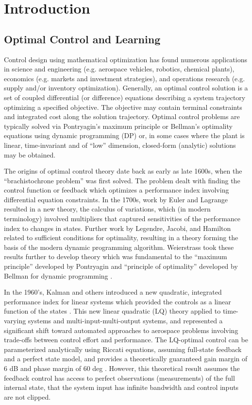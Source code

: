 \chapter{Introduction}
\label{chap:intro}

\section{Optimal Control and Learning}
\label{chap:introOptimalControlLearning}
Control design using mathematical optimization has found numerous applications in science and engineering (e.g. aerospace vehicles, robotics, chemical plants), economics (e.g. markets and investment strategies), and operations research (e.g. supply and/or inventory optimization).  Generally, an optimal control solution is a set of coupled differential (or difference) equations describing a system trajectory optimizing a specified objective.  The objective may contain terminal constraints and integrated cost along the solution trajectory.  Optimal control problems are typically solved via Pontryagin's maximum principle or Bellman's optimality equations using dynamic programming (DP) \cite{stengel,kirk} or, in some cases where the plant is linear, time-invariant and of ``low'' dimension, closed-form (analytic) solutions may be obtained.

The origins of optimal control theory date back as early as late 1600s, when the ``brachistochrone problem'' was first solved.  The problem dealt with finding the control function or feedback which optimizes a performance index involving differential equation constraints.  In the 1700s, work by Euler and Lagrange resulted in a new theory, the calculus of variations, which (in modern terminology) involved multipliers that captured sensitivities of the performance index to changes in states.  Further work by Legendre, Jacobi, and Hamilton related to sufficient conditions for optimality, resulting in a theory forming the basis of the modern dynamic programming algorithm.  Weierstrass took these results further to develop theory which was fundamental to the ``maximum principle'' developed by Pontryagin and ``principle of optimality'' developed by Bellman for dynamic programming \cite{bryson1996optimal}.

In the 1960's, Kalman and others introduced a new quadratic, integrated performance index for linear systems which provided the controls as a linear function of the states \cite{kalman1960contributions}.  This new linear quadratic (LQ) theory applied to time-varying systems and multi-input-multi-output systems, and represented a significant shift toward automated approaches to aerospace problems involving trade-offs between control effort and performance.  The LQ-optimal control can be parameterized analytically using Riccati equations, assuming full-state feedback and a perfect state model, and provides a theoretically guaranteed gain margin of 6 dB and phase margin of 60 deg \cite{safonov1977gain}.  However, this theoretical result assumes the feedback control has access to perfect observations (measurements) of the full internal state, that the system input has infinite bandwidth and control inputs are not clipped.

